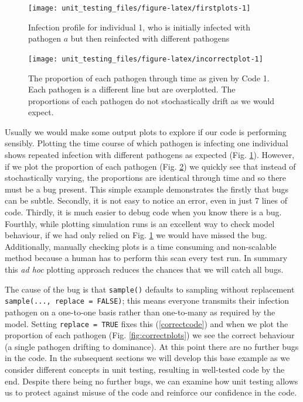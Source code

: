 \documentclass[
]{article}
\begin{document}
\begin{figure}[h]

{\centering \texttt{[image: unit\_testing\_files/figure-latex/firstplots-1]} 

}

\caption{Infection profile for individual 1, who is initially infected with pathogen $a$ but then reinfected with different pathogens}\label{fig:firstplots}
\end{figure}

\begin{figure}[h]

{\centering \texttt{[image: unit\_testing\_files/figure-latex/incorrectplot-1]} 

}

\caption{ The proportion of each pathogen through time as given by Code 1. Each pathogen is a different line but are overplotted. The proportions of each pathogen do not stochastically drift as we would expect.}\label{fig:incorrectplot}
\end{figure}

Usually we would make some output plots to explore if our code is performing sensibly.
Plotting the time course of which pathogen is infecting one individual shows repeated infection with different pathogens as expected (Fig. \ref{fig:firstplots}).
However, if we plot the proportion of each pathogen (Fig. \ref{fig:incorrectplot}) we quickly see that instead of stochastically varying, the proportions are identical through time and so there must be a bug present.
This simple example demonstrates the firstly that bugs can be subtle.
Secondly, it is not easy to notice an error, even in just 7 lines of code.
Thirdly, it is much easier to debug code when you know there is a bug.
Fourthly, while plotting simulation runs is an excellent way to check model behaviour, if we had only relied on Fig. \ref{fig:firstplots} we would have missed the bug.
Additionally, manually checking plots is a time consuming and non-scalable method because a human has to perform this scan every test run.
In summary this \emph{ad hoc} plotting approach reduces the chances that we will catch all bugs.

The cause of the bug is that \texttt{sample()} defaults to sampling without replacement \texttt{sample(...,\ replace\ =\ FALSE)}; this means everyone transmits their infection pathogen on a one-to-one basis rather than one-to-many as required by the model.
Setting \texttt{replace\ =\ TRUE} fixes this (\ref{correctcode}) and when we plot the proportion of each pathogen (Fig. \ref{fig:correctplots}) we see the correct behaviour (a single pathogen drifting to dominance).
At this point there are no further bugs in the code.
In the subsequent sections we will develop this base example as we consider different concepts in unit testing, resulting in well-tested code by the end.
Despite there being no further bugs, we can examine how unit testing allows us to protect against misuse of the code and reinforce our confidence in the code.
\newline
{}\label{correctcode}
\end{document}

